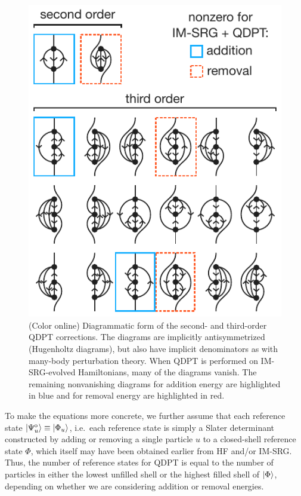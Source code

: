 \begin{figure}
\includegraphics{fig-diagrams-sfe.pdf}
\caption{(Color online) Diagrammatic form of the second- and third-order QDPT corrections.  The diagrams are implicitly antisymmetrized (Hugenholtz diagrams), but also have implicit denominators as with many-body perturbation theory.  When QDPT is performed on IM-SRG-evolved Hamiltonians, many of the diagrams vanish.  The remaining nonvanishing diagrams for addition energy are highlighted in blue and for removal energy are highlighted in red.}
\label{fig:diagrams-sfe}
\end{figure}

To make the equations more concrete, we further assume that each reference state $| \Psi^{\mathrm{o}}_u \rangle \equiv | \Phi_u \rangle$, i.e.\ each reference state is simply a Slater determinant constructed by adding or removing a single particle $u$ to a closed-shell reference state $\Phi$, which itself may have been obtained earlier from HF and/or IM-SRG.  Thus, the number of reference states for QDPT is equal to the number of particles in either the lowest unfilled shell or the highest filled shell of $| \Phi \rangle$, depending on whether we are considering addition or removal energies.

